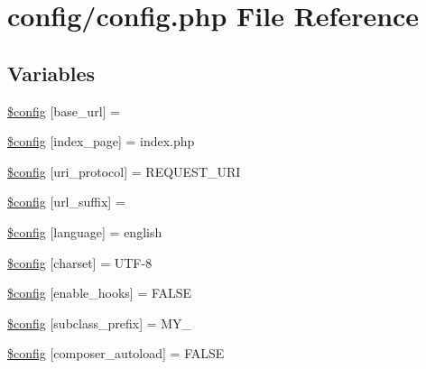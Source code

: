 \hypertarget{config_8php}{}\section{config/config.php File Reference}
\label{config_8php}
\subsection*{Variables}
\begin{DoxyCompactItemize}
\item 
\mbox{\hyperlink{config_8php_ab7d3dc1aba181a1198e7f26609046673}{\$config}} \mbox{[}\textquotesingle{}base\+\_\+url\textquotesingle{}\mbox{]} = \textquotesingle{}\textquotesingle{}
\item 
\mbox{\hyperlink{config_8php_a58f062e2a0bc777dad9a430970a7e50b}{\$config}} \mbox{[}\textquotesingle{}index\+\_\+page\textquotesingle{}\mbox{]} = \textquotesingle{}index.\+php\textquotesingle{}
\item 
\mbox{\hyperlink{config_8php_a7e0a80976b25629e97a7c93f1d278d99}{\$config}} \mbox{[}\textquotesingle{}uri\+\_\+protocol\textquotesingle{}\mbox{]} = \textquotesingle{}R\+E\+Q\+U\+E\+S\+T\+\_\+\+U\+RI\textquotesingle{}
\item 
\mbox{\hyperlink{config_8php_ad1183c73fa84c832075d7220c49dc6b2}{\$config}} \mbox{[}\textquotesingle{}url\+\_\+suffix\textquotesingle{}\mbox{]} = \textquotesingle{}\textquotesingle{}
\item 
\mbox{\hyperlink{config_8php_a36e8d14df9a48c1e0945975109946e8b}{\$config}} \mbox{[}\textquotesingle{}language\textquotesingle{}\mbox{]} = \textquotesingle{}english\textquotesingle{}
\item 
\mbox{\hyperlink{config_8php_a071d6716931a0a13a16629257e9ef345}{\$config}} \mbox{[}\textquotesingle{}charset\textquotesingle{}\mbox{]} = \textquotesingle{}U\+TF-\/8\textquotesingle{}
\item 
\mbox{\hyperlink{config_8php_ae152db70ca5fa75e4b1cea6ac02116de}{\$config}} \mbox{[}\textquotesingle{}enable\+\_\+hooks\textquotesingle{}\mbox{]} = F\+A\+L\+SE
\item 
\mbox{\hyperlink{config_8php_a815be6a457c426ff84d3a1c589c6853e}{\$config}} \mbox{[}\textquotesingle{}subclass\+\_\+prefix\textquotesingle{}\mbox{]} = \textquotesingle{}M\+Y\+\_\+\textquotesingle{}
\item 
\mbox{\hyperlink{config_8php_af175f69a791ec78be5bc6c6ecf6176e9}{\$config}} \mbox{[}\textquotesingle{}composer\+\_\+autoload\textquotesingle{}\mbox{]} = F\+A\+L\+SE

\end{DoxyCompactItemize}
